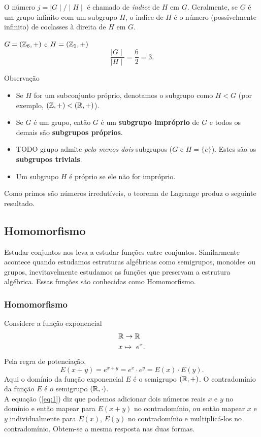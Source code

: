 \begin{definition}[Magma]
         O número $j = \mid G\mid / \mid H\mid$ é chamado de \emph{índice} de $H$ em $G$. Geralmente, se $G$ é um grupo infinito com um subgrupo $H$, o indice de $H$ é o número (possivelmente infinito) de coclasses à direita de $H$ em $G$.
         \begin{exmp}
            $G=(\mathbb{Z}_{6},+)$ e $H=(\mathbb{Z}_{1},+)$
            $$\dfrac{\mid G \mid}{\mid H \mid} = \dfrac{6}{2} = 3.$$
         \end{exmp}
         \begin{mymdframed}{Observação}
         \begin{itemize}
            \item Se $H$ for um subconjunto próprio, denotamos o subgrupo como $H < G$ (por exemplo, $(\mathbb{Z}, +) < (\mathbb{R}, +)$).
            \item Se $G$ é um grupo, então $G$ é um \textbf{subgrupo impróprio} de $G$ e todos os demais são \textbf{subgrupos próprios}.
            \item TODO grupo admite \emph{pelo menos dois} subgrupos ($G$ e $H = \{e\}$). Estes são os \textbf{subgrupos triviais}.
            \item Um subgrupo $H$ é próprio se ele não for impróprio.
         \end{itemize}
         \end{mymdframed}
         Como primos são números irredutíveis, o teorema de Lagrange produz o seguinte resultado.

   \subsection{Homomorfismo}
      Estudar conjuntos nos leva a estudar funções entre conjuntos. Similarmente acontece quando estudamos estruturas algébricas como semigrupos, monoides ou grupos, inevitavelmente estudamos as funções que preservam a estrutura algébrica. Essas funções são conhecidas como Homomorfismo.
      \subsubsection{Homomorfismo}
         Considere a função exponencial
         \begin{alignat}{2}
            &\mathbb{R} \to \mathbb{R} \nonumber\\
            &x \mapsto\ e^{x}.
            \nonumber
         \end{alignat}
         Pela regra de potenciação,
         \begin{equation}\label{eq:1}
            E(x+y)=e^{x+y} = e^{x}\cdot e^{y} = E(x)\cdot E(y).  
         \end{equation}
         Aqui o domínio da função exponencial $E$ é o semigrupo $(\mathbb{R},+)$. O contradomínio da função $E$ é o semigrupo $(\mathbb{R},\cdot)$.\\
         A equação (\ref{eq:1}) diz que podemos adicionar dois números reais $x$ e $y$ no domínio e então mapear para $E(x+y)$ no contradomínio, ou então mapear $x$ e $y$ individualmente para $E(x)$, $E(y)$ no contradomínio e multiplicá-los no contradomínio. Obtem-se a mesma resposta nas duas formas.


\end{definition}
